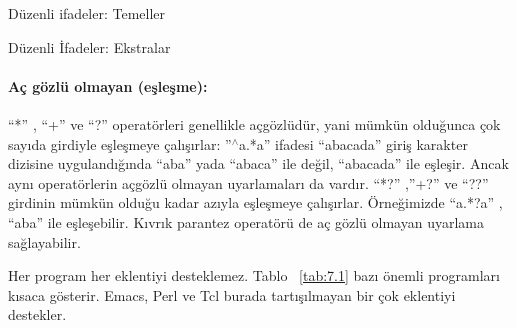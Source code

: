 \begin{section}{Düzenli ifadeler: Temeller}
\begin{subsection}{Düzenli İfadeler: Ekstralar}
\paragraph{Aç gözlü olmayan (eşleşme):}{“*” , “+” ve “?” operatörleri genellikle açgözlüdür, yani mümkün olduğunca çok sayıda girdiyle eşleşmeye çalışırlar: ”$ ^\wedge $a.*a” ifadesi “abacada” giriş karakter dizisine uygulandığında “aba” yada “abaca” ile değil, “abacada” ile eşleşir. Ancak aynı operatörlerin açgözlü olmayan uyarlamaları da vardır. “*?” ,”+?” ve “??” girdinin mümkün olduğu kadar azıyla eşleşmeye çalışırlar. Örneğimizde “a.*?a” , “aba” ile eşleşebilir. Kıvrık parantez operatörü de aç gözlü olmayan uyarlama sağlayabilir.}
 
Her program her eklentiyi desteklemez. Tablo ~\ref{tab:7.1} bazı önemli programları kısaca gösterir. Emacs, Perl ve Tcl burada tartışılmayan bir çok eklentiyi destekler.


\end{subsection}
\end{section}
